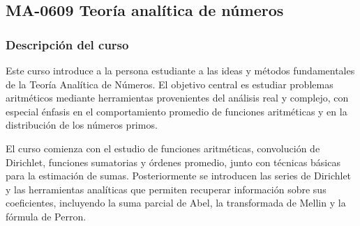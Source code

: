 \newpage
\subsection*{MA-0609 Teoría analítica de números}

\hypertarget{MA0609}{}
\begin{refsection}
\begin{table}[H]
\end{table}

\subsubsection*{Descripción del curso}

Este curso introduce a la persona estudiante a las ideas y métodos fundamentales de la Teoría Analítica de Números. El objetivo central es estudiar problemas aritméticos mediante herramientas provenientes del análisis real y complejo, con especial énfasis en el comportamiento promedio de funciones aritméticas y en la distribución de los números primos.

El curso comienza con el estudio de funciones aritméticas, convolución de Dirichlet, funciones sumatorias y órdenes promedio, junto con técnicas básicas para la estimación de sumas. Posteriormente se introducen las series de Dirichlet y las herramientas analíticas que permiten recuperar información sobre sus coeficientes, incluyendo la suma parcial de Abel, la transformada de Mellin y la fórmula de Perron.


\end{refsection}
